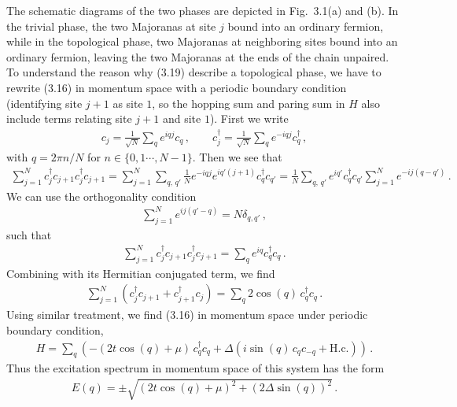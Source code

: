 \documentclass[11pt, oneside]{book}
\theoremstyle{break}
\theoremstyle{break}
\begin{document}
The schematic diagrams of the two phases are depicted in Fig.\, 3.1(a) and (b). In the trivial phase, the two Majoranas at site $j$ bound into an ordinary fermion, while in the topological phase, two Majoranas at neighboring sites bound into an ordinary fermion, leaving the two Majoranas at the ends of the chain unpaired. To understand the reason why (3.19) describe a topological phase, we have to rewrite (3.16) in momentum space with a periodic boundary condition (identifying site $j+1$ as site $1$, so the hopping sum and paring sum in $H$ also include terms relating site $j+1$ and site $1$). First we write
\begin{align}
c_j = \frac{1}{\sqrt{N}}\sum_q e^{iqj} c_q\,,\qquad
c_j^\dagger = \frac{1}{\sqrt{N}}\sum_q e^{-iqj} c_q^\dagger\,,
\end{align}
with $q = 2\pi n/N$ for $n \in \{0,1\cdots, N-1\}$. Then we see that 
\begin{align}
\sum_{j=1}^{N}c_j^\dagger c_{j+1}c_j^\dagger c_{j+1} = 
\sum_{j=1}^{N} \sum_{q,\,q'} \frac{1}{N}e^{-iqj}e^{iq'(j+1)} c_q^\dagger c_{q'} =\frac{1}{N}\sum_{q,\,q'}e^{iq'}c_q^\dagger c_{q'} \sum_{j=1}^N e^{-ij(q-q')}\,.
\end{align}
We can use the orthogonality condition
\begin{align}
\sum_{j=1}^N e^{ij(q'-q)} = N\delta_{q,q'}\,,
\end{align}
such that 
\begin{align}
\sum_{j=1}^{N}c_j^\dagger c_{j+1}c_j^\dagger c_{j+1} = \sum_q e^{iq} c_q^\dagger c_q\,.
\end{align}
Combining with its Hermitian conjugated term, we find
\begin{align}
\sum_{j=1}^N \left(c_j^\dagger c_{j+1} + c_{j+1}^\dagger c_j\right) = \sum_q 2\cos(q) \, c_q^\dagger c_q\,.
\end{align}
Using similar treatment, we find (3.16) in momentum space under periodic boundary condition, 
\begin{align}
H =\sum_q \left(
-(2t\cos(q)+ \mu) \,c_q^\dagger c_q + \Delta (i \sin(q)\, c_q c_{-q} + \text{H.c.})
\right)\,.
\end{align}
Thus the excitation spectrum in momentum space of this system has the form
\begin{align}
E(q) = \pm \sqrt{(2t\cos(q) +\mu)^2 + (2\Delta \sin(q))^2}\,.
\end{align}
\end{document}
